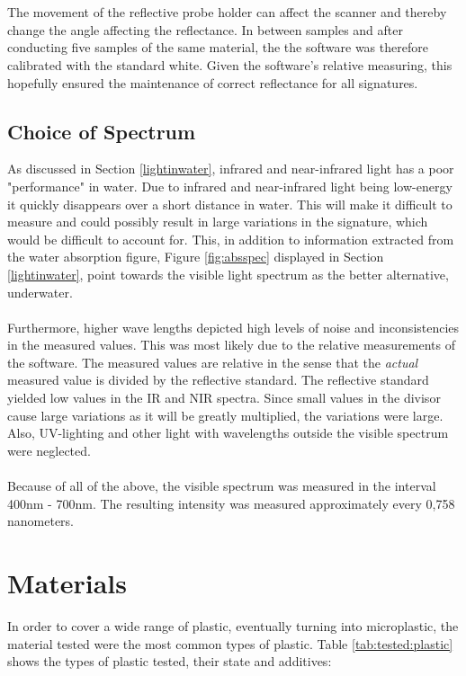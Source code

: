 \\\\
The movement of the reflective probe holder can affect the scanner and thereby change the angle affecting the reflectance. In between samples and after conducting five samples of the same material, the the software was therefore calibrated with the standard white. Given the software’s relative measuring, this hopefully ensured the maintenance of correct reflectance for all signatures.

\subsection{Choice of Spectrum}
As discussed in Section \ref{lightinwater}, infrared and near-infrared light has a poor "performance" in water. Due to infrared and near-infrared light being low-energy it quickly disappears over a short distance in water. This will make it difficult to measure and could possibly result in large variations in the signature, which would be difficult to account for. This, in addition to information extracted from the water absorption figure, Figure \ref{fig:absspec} displayed in Section \ref{lightinwater}, point towards the visible light spectrum as the better alternative, underwater.
\\\\
Furthermore, higher wave lengths depicted high levels of noise and inconsistencies in the measured values. This was most likely due to the relative measurements of the software. The measured values are relative in the sense that the \textit{actual} measured value is divided by the reflective standard. The reflective standard yielded low values in the IR and NIR spectra. Since small values in the divisor cause large variations as it will be greatly multiplied, the variations were large. Also, UV-lighting and other light with wavelengths outside the visible spectrum were neglected.
\\\\
Because of all of the above, the visible spectrum was measured in the interval 400nm - 700nm. The resulting intensity was measured approximately every 0,758 nanometers. 

\section{Materials} \label{sec:material}
In order to cover a wide range of plastic, eventually turning into microplastic, the material tested were the most common types of plastic. Table \ref{tab:tested:plastic} shows the types of plastic tested, their state and additives:

